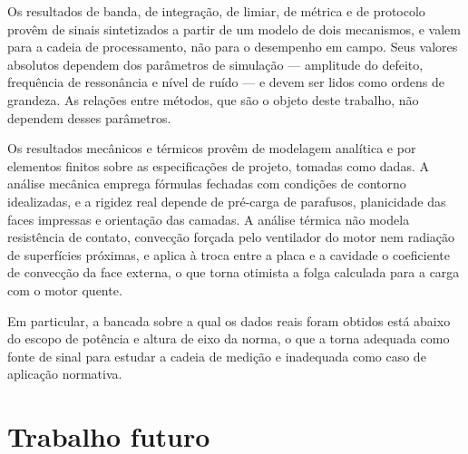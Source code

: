 Os resultados de banda, de integração, de limiar, de métrica e de protocolo provêm de sinais
sintetizados a partir de um modelo de dois mecanismos, e valem para a cadeia de
processamento, não para o desempenho em campo. Seus valores absolutos dependem dos
parâmetros de simulação --- amplitude do defeito, frequência de ressonância e nível de
ruído --- e devem ser lidos como ordens de grandeza. As relações entre métodos, que são o
objeto deste trabalho, não dependem desses parâmetros.

Os resultados mecânicos e térmicos provêm de modelagem analítica e por elementos finitos
sobre as especificações de projeto, tomadas como dadas. A análise mecânica emprega
fórmulas fechadas com condições de contorno idealizadas, e a rigidez real depende de
pré-carga de parafusos, planicidade das faces impressas e orientação das camadas. A análise
térmica não modela resistência de contato, convecção forçada pelo ventilador do motor nem
radiação de superfícies próximas, e aplica à troca entre a placa e a cavidade o coeficiente
de convecção da face externa, o que torna otimista a folga calculada para a carga com o
motor quente.

 Em particular, a bancada sobre a qual os dados reais foram obtidos está abaixo
do escopo de potência e altura de eixo da norma, o que a torna adequada como fonte de
sinal para estudar a cadeia de medição e inadequada como caso de aplicação normativa.


\section{Trabalho futuro}
\label{sec:conc-futuro}


